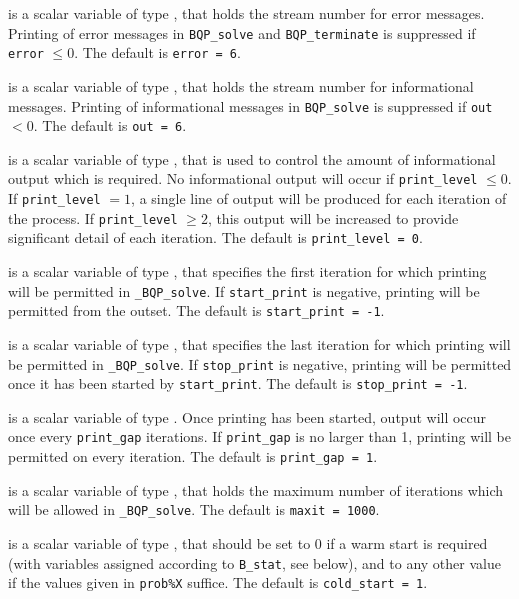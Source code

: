 \documentclass{galahad}
\newcommand{\packagename}{BQP}
\newcommand{\fullpackagename}{\libraryname\_\packagename}
\newcommand{\solver}{{\tt \fullpackagename\_solve}}
\begin{document}
\begin{description}

 is a scalar variable of type \integer, that holds the
stream number for error messages. Printing of error messages in 
{\tt \packagename\_solve} and {\tt \packagename\_terminate} 
is suppressed if {\tt error} $\leq 0$.
The default is {\tt error = 6}.

 is a scalar variable of type \integer, that holds the
stream number for informational messages. Printing of informational messages in 
{\tt \packagename\_solve} is suppressed if {\tt out} $< 0$.
The default is {\tt out = 6}.

 is a scalar variable of type \integer, that is used
to control the amount of informational output which is required. No 
informational output will occur if {\tt print\_level} $\leq 0$. If 
{\tt print\_level} $= 1$, a single line of output will be produced for each
iteration of the process. If {\tt print\_level} $\geq 2$, this output will be
increased to provide significant detail of each iteration.
The default is {\tt print\_level = 0}.

 is a scalar variable of type \integer, that specifies
the first iteration for which printing will be permitted in \solver.
If {\tt start\_print} is negative, printing will be permitted from the outset.
The default is {\tt start\_print = -1}.

 is a scalar variable of type \integer, that specifies
the last iteration for which printing will be permitted in  \solver.
If {\tt stop\_print} is negative, printing will be permitted once it has been 
started by {\tt start\_print}.
The default is {\tt stop\_print = -1}.

 is a scalar variable of type \integer.
Once printing has been started, output will occur once every
{\tt print\_gap} iterations. If {\tt print\_gap} is no larger than 1, 
printing will be permitted on every iteration.
The default is {\tt print\_gap = 1}.

 is a scalar variable of type \integer, that holds the
maximum number of iterations which will be allowed in \solver.
The default is {\tt maxit = 1000}.

 is a scalar variable of type \integer, that 
should be set to 0 if a warm start is required (with variables
assigned according to {\tt B\_stat}, see below), and to any other value if the
values given in {\tt prob\%X} suffice.
The default is {\tt cold\_start = 1}.


\end{description}
\end{document}
